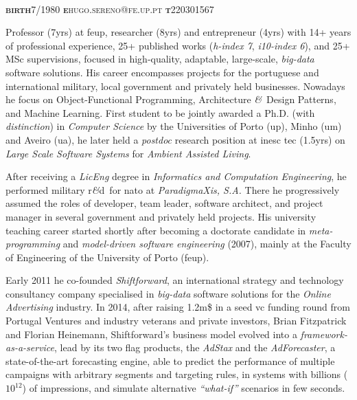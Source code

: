 \documentclass[9pt, a4paper, pstricks]{article}
\newcommand{\amper}{{\fontspec[Scale=.95]{Hoefler Text}\selectfont\itshape\&}}
\newcommand{\years}[1]{\marginnote{\small #1}}
\newcommand{\marginimage}{
}
\newcommand{\acr}[1]{{\sc #1}}
\newcommand{\rnd}{{\sc r\amper d}~}
\begin{document}

{\huge\sc{}}\\
{\small {\scshape  {\bfseries birth}\hspace{2mm}7/1980 \hspace{8mm} {\bfseries e}\hspace{2mm}hugo.sereno@fe.up.pt \hspace{8mm} {\bfseries t}\hspace{2mm}220301567}}\\

\years{\vspace{-4mm}\\\hspace*{-10mm}\texttt{[image: qrcode.eps]}}\marginimage{\small Professor (7yrs) at {\sc feup}, researcher (8yrs) and entrepreneur (4yrs) with 14+ years of professional experience, 25+ published works (\emph{h-index 7}, \emph{i10-index 6}), and 25+ MSc supervisions, focused in high-quality, adaptable, large-scale, \emph{big-data} software solutions. His career encompasses projects for the portuguese and international military, local government and privately held businesses. Nowadays he focus on Object-Functional Programming, Architecture \amper~Design Patterns, and Machine Learning. First student to be jointly awarded a Ph.D. (with \emph{distinction}) in \emph{Computer Science} by the Universities of Porto {\sc (up)}, Minho {\sc (um)} and Aveiro {\sc (ua)}, he later held a \emph{postdoc} research position at \acr{inesc tec} (1.5yrs) on \emph{Large Scale Software Systems} for \emph{Ambient Assisted Living}.

\vspace{1mm}After receiving a \emph{LicEng} degree in \emph{Informatics and Computation Engineering}, he performed military \rnd for \acr{nato} at \emph{ParadigmaXis, S.A.} There he progressively assumed the roles of developer, team leader, software architect, and project manager in several government and privately held projects. His university teaching career started shortly after becoming a doctorate candidate in \emph{meta-programming} and \emph{model-driven software engineering} (2007), mainly at the Faculty of Engineering of the University of Porto (\acr{feup}).

\vspace{1mm}Early 2011 he co-founded \emph{Shiftforward}, an international strategy and technology consultancy company specialised in \emph{big-data} software solutions for the \emph{Online Advertising} industry. In 2014, after raising 1.2{\sc m}\$ in a seed {\sc vc} funding round from Portugal Ventures and industry veterans and private investors, Brian Fitzpatrick and Florian Heinemann, Shiftforward's business model evolved into a \emph{framework-as-a-service}, lead by its two flag products, the \emph{AdStax} and the \emph{AdForecaster}, a state-of-the-art forecasting engine, able to predict the performance of multiple campaigns with arbitrary segments and targeting rules, in systems with billions ($10^{12}$) of impressions, and simulate alternative \emph{``what-if''} scenarios in few seconds.}
\end{document}
